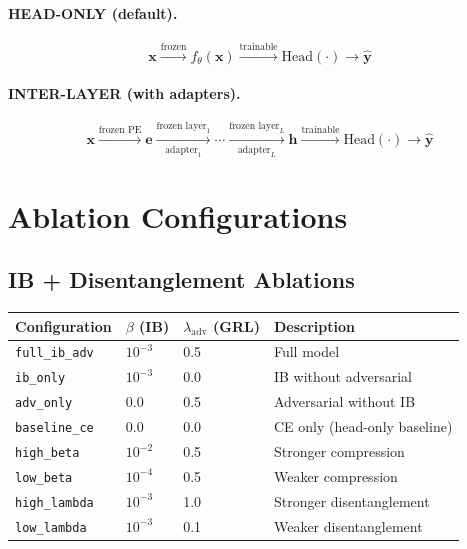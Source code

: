 \documentclass{article}
\newcommand{\bx}{\bm{x}}
\begin{document}
\paragraph{HEAD-ONLY (default).}
\begin{equation}
\bx \xrightarrow{\text{frozen}} f_\theta(\bx) \xrightarrow{\text{trainable}} \text{Head}(\cdot) \to \hat{\bm{y}}
\end{equation}

\paragraph{INTER-LAYER (with adapters).}
\begin{equation}
\bx \xrightarrow{\text{frozen PE}} \bm{e} \xrightarrow[\text{adapter}_1]{\text{frozen layer}_1} \cdots \xrightarrow[\text{adapter}_L]{\text{frozen layer}_L} \bm{h} \xrightarrow{\text{trainable}} \text{Head}(\cdot) \to \hat{\bm{y}}
\end{equation}

\section{Ablation Configurations}
\label{sec:ablation}

\subsection{IB + Disentanglement Ablations}

\begin{table}[h]
\centering
\small
\begin{tabular}{@{}llll@{}}
\toprule
Configuration & $\beta$ (IB) & $\lambda_\text{adv}$ (GRL) & Description \\
\midrule
\texttt{full\_ib\_adv} & $10^{-3}$ & 0.5 & Full model \\
\texttt{ib\_only} & $10^{-3}$ & 0.0 & IB without adversarial \\
\texttt{adv\_only} & 0.0 & 0.5 & Adversarial without IB \\
\texttt{baseline\_ce} & 0.0 & 0.0 & CE only (head-only baseline) \\
\texttt{high\_beta} & $10^{-2}$ & 0.5 & Stronger compression \\
\texttt{low\_beta} & $10^{-4}$ & 0.5 & Weaker compression \\
\texttt{high\_lambda} & $10^{-3}$ & 1.0 & Stronger disentanglement \\
\texttt{low\_lambda} & $10^{-3}$ & 0.1 & Weaker disentanglement \\
\bottomrule
\end{tabular}
\end{table}
\end{document}
